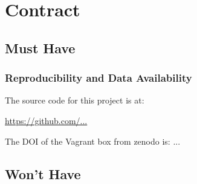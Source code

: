 \chapter{Contract}\label{chapter:contract}
\section{Must Have}
\subsection{Reproducibility and Data Availability}
The source code for this project is at:
\begin{center}
    \footnotesize
    \url{https://github.com/...}
\end{center}
The DOI of the Vagrant box from zenodo is: ...



\section{Won't Have}
